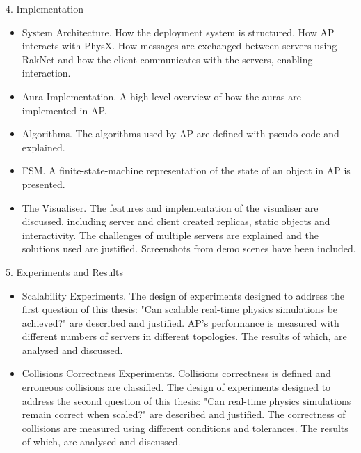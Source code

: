 4. Implementation
\begin{itemize}
	\item System Architecture. How the deployment system is structured. How AP interacts with PhysX. How messages are exchanged between servers using RakNet and how the client communicates with the servers, enabling interaction.
	\item Aura Implementation. A high-level overview of how the auras are implemented in AP.
	\item Algorithms. The algorithms used by AP are defined with pseudo-code and explained.
	\item FSM. A finite-state-machine representation of the state of an object in AP is presented.
	\item The Visualiser. The features and implementation of the visualiser are discussed, including server and client created replicas, static objects and interactivity. The challenges of multiple servers are explained and the solutions used are justified. Screenshots from demo scenes have been included.
\end{itemize}

5. Experiments and Results
\begin{itemize}
	\item Scalability Experiments. The design of experiments designed to address the first question of this thesis: "Can scalable real-time physics simulations be achieved?" are described and justified. AP's performance is measured with different numbers of servers in different topologies. The results of which, are analysed and discussed.
	\item Collisions Correctness Experiments. Collisions correctness is defined and erroneous collisions are classified. The design of experiments designed to address the second question of this thesis: "Can real-time physics simulations remain correct when scaled?" are described and justified. The correctness of collisions are measured using different conditions and tolerances. The results of which, are analysed and discussed.
\end{itemize}

